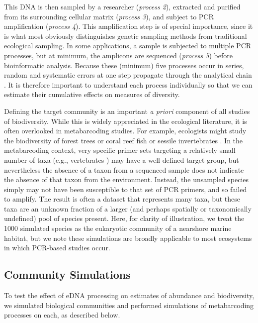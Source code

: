 \documentclass[fleqn,11pt,lineno]{wlscirep}
\begin{document}
This DNA is then sampled by a researcher (\textit{process 2}), extracted and purified from its surrounding cellular matrix (\textit{process 3}), and subject to PCR amplification (\textit{process 4}). This amplification step is of special importance, since it is what most obviously distinguishes genetic sampling methods from traditional ecological sampling. In some applications, a sample is subjected to multiple PCR processes, but at minimum, the amplicons are sequenced (\textit{process 5}) before bioinformatic analysis. Because these (minimum) five processes occur in series, random and systematic errors at one step propagate through the analytical chain \cite{shelton2016framework}. It is therefore important to understand each process individually so that we can estimate their cumulative effects on measures of diversity. 

Defining the target community is an important \textit{a priori} component of all studies of biodiversity.  While this is widely appreciated in the ecological literature, it is often overlooked in metabarcoding studies. For example, ecologists might study the biodiversity of forest trees \cite{Condit1996} or coral reef fish \cite{mora2003patterns} or sessile invertebrates \cite{witman2004relationship}. In the metabarcoding context, very specific primer sets targeting a relatively small number of taxa (e.g., vertebrates \cite{riaz_ecoprimers:_2011, yamamoto2017environmental}) may have a well-defined target group, but nevertheless the absence of a taxon from a sequenced sample does not indicate the absence of that taxon from the environment. Instead, the unsampled species simply may not have been susceptible to that set of PCR primers, and so failed to amplify. The result is often a dataset that represents many taxa, but these taxa are an unknown fraction of a larger (and perhaps spatially or taxonomically undefined) pool of species present. Here, for clarity of illustration, we treat the 1000 simulated species as the eukaryotic community of a nearshore marine habitat, but we note these simulations are broadly applicable to most ecosystems in which PCR-based studies occur.

\subsection*{Community Simulations}

To test the effect of eDNA processing on estimates of abundance and biodiversity, we simulated biological communities and performed simulations of metabarcoding processes on each, as described below.
\end{document}
